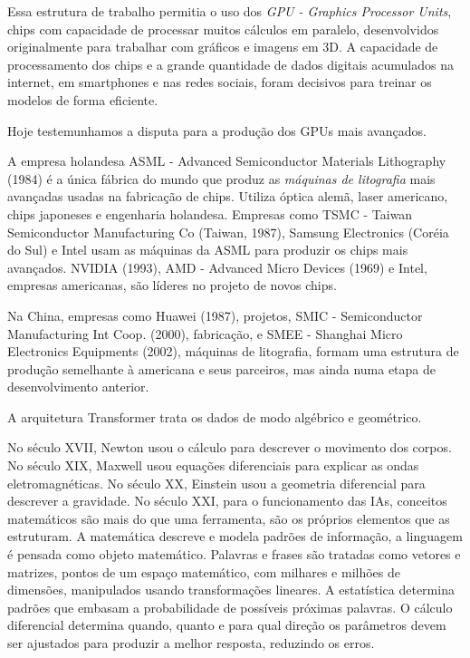 \documentclass{hipatia}
\begin{document}
Essa estrutura de trabalho permitia o uso dos \textit{GPU - Graphics Processor Units}, chips com capacidade de processar muitos cálculos em paralelo, desenvolvidos originalmente para trabalhar com gráficos e imagens em 3D. A capacidade de processamento dos chips e a grande quantidade de dados digitais acumulados na internet, em smartphones e nas redes sociais, foram decisivos para treinar os modelos de forma eficiente.
	
Hoje testemunhamos a disputa para a produção dos GPUs mais avançados. 

A empresa holandesa ASML - Advanced Semiconductor Materials Lithography (1984) é a única fábrica do mundo que produz as \textit{máquinas de litografia} mais avançadas  usadas na fabricação de chips. Utiliza óptica alemã, laser americano, chips japoneses e engenharia holandesa. Empresas como TSMC - Taiwan Semiconductor Manufacturing Co (Taiwan, 1987), Samsung Electronics (Coréia do Sul) e Intel usam as máquinas da ASML para produzir os chips mais avançados. NVIDIA (1993), AMD - Advanced Micro Devices (1969) e Intel, empresas americanas, são líderes no projeto de novos chips.

Na China, empresas como Huawei (1987), projetos, SMIC - Semiconductor Manufacturing Int Coop. (2000), fabricação, e SMEE - Shanghai Micro Electronics Equipments (2002), máquinas de litografia, formam uma estrutura de produção semelhante à americana e seus parceiros, mas ainda numa etapa de desenvolvimento anterior.

A arquitetura Transformer trata os dados de modo algébrico e geométrico. 

No século XVII, Newton usou o cálculo para descrever o movimento dos corpos. No século XIX, Maxwell usou equações diferenciais para explicar as ondas eletromagnéticas. No século XX, Einstein usou a geometria diferencial para descrever a gravidade. No século XXI, para o funcionamento das IAs, conceitos matemáticos são mais do que uma ferramenta, são os próprios elementos que as estruturam. A matemática descreve e modela padrões de informação, a linguagem é pensada como objeto matemático. Palavras e frases são tratadas como vetores e matrizes, pontos de um espaço matemático, com milhares e milhões de dimensões, manipulados usando transformações lineares. A estatística determina padrões que embasam a probabilidade de possíveis próximas palavras. O cálculo diferencial determina quando, quanto e para qual direção os parâmetros devem ser ajustados para produzir a melhor resposta, reduzindo os erros.
\end{document}
